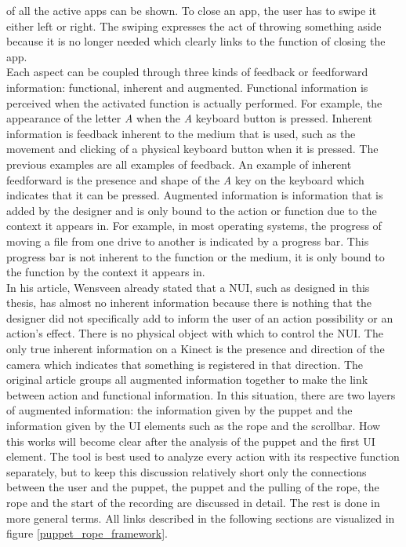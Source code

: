 of all the active apps can be shown. To close an app, the user has to swipe it either left or right. The swiping expresses the act of throwing something aside because it is no longer needed which clearly links to the function of closing the app.\\

Each aspect can be coupled through three kinds of feedback or feedforward information: functional, inherent and augmented. Functional information is perceived when the activated function is actually performed. For example, the appearance of the letter \emph{A} when the \emph{A} keyboard button is pressed. Inherent information is feedback inherent to the medium that is used, such as the movement and clicking of a physical keyboard button when it is pressed. The previous examples are all examples of feedback. An example of inherent feedforward is the presence and shape of the \emph{A} key on the keyboard which indicates that it can be pressed. Augmented information is information that is added by the designer and is only bound to the action or function due to the context it appears in. For example, in most operating systems, the progress of moving a file from one drive to another is indicated by a progress bar. This progress bar is not inherent to the function or the medium, it is only bound to the function by the context it appears in.\\

In his article, Wensveen already stated that a NUI, such as designed in this thesis, has almost no inherent information because there is nothing that the designer did not specifically add to inform the user of an action possibility or an action's effect. There is no physical object with which to control the NUI. The only true inherent information on a Kinect is the presence and direction of the camera which indicates that something is registered in that direction. The original article groups all augmented information together to make the link between action and functional information. In this situation, there are two layers of augmented information: the information given by the puppet and the information given by the UI elements such as the rope and the scrollbar. How this works will become clear after the analysis of the puppet and the first UI element. The tool is best used to analyze every action with its respective function separately, but to keep this discussion relatively short only the connections between the user and the puppet, the puppet and the pulling of the rope, the rope and the start of the recording are discussed in detail. The rest is done in more general terms. All links described in the following sections are visualized in figure \ref{puppet_rope_framework}.\\

